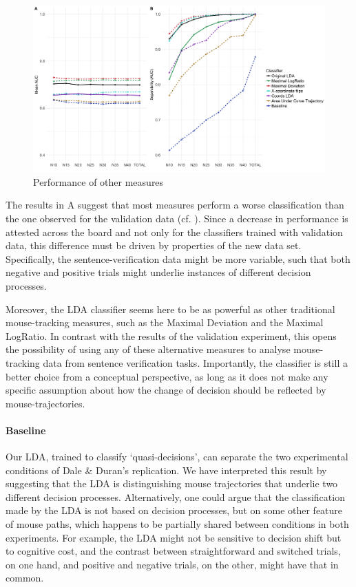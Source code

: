 \documentclass{article}
\begin{document}
\begin{figure}
\centering
\includegraphics[width=\textwidth]{auc_permutation_negation_2.png}
\caption{Performance of other measures}
\label{fig:permutation_AUC_negation_measures}
\end{figure}

The results in A suggest that most measures perform a worse classification than the one observed for the validation data (cf. ). 
Since a decrease in performance is attested across the board and not only for the classifiers trained with validation data, 
this difference must be driven by properties of the new data set. Specifically, the sentence-verification data might be more variable, such that both negative and positive trials might underlie instances of different decision processes. 

Moreover, the LDA classifier seems here to be as powerful as other traditional mouse-tracking measures, such as the Maximal Deviation and the Maximal LogRatio. In contrast with the results of the validation experiment, this opens the possibility of using any of these alternative measures to analyse mouse-tracking data from sentence verification tasks. Importantly, the classifier is still a better choice from a conceptual perspective, as long as it does not make any specific assumption about how the change of decision should be reflected by mouse-trajectories.  

\paragraph{Baseline}
Our LDA, trained to classify `quasi-decisions', can separate the two experimental conditions of Dale \& Duran's replication. We have interpreted this result by suggesting that the LDA is distinguishing mouse trajectories that underlie two different decision processes. 
Alternatively, one could argue that the classification made by the LDA is not based on decision processes, but on some other feature of mouse paths, which happens to be partially shared between conditions in both experiments. 
For example, the LDA might not be sensitive to decision shift but to cognitive cost, and the contrast between straightforward and switched trials, on one hand, and positive and negative trials, on the other, might have that in common. 
\end{document}
